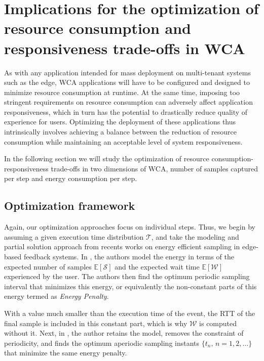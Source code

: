 \section{Implications for the optimization of resource consumption and responsiveness trade-offs in \ac{WCA}}\label{sec:implications:optimization}

As with any application intended for mass deployment on multi-tenant systems such as the edge, \ac{WCA} applications will have to be configured and designed to minimize resource consumption at runtime.
At the same time, imposing too stringent requirements on resource consumption can adversely affect application responsiveness, which in turn has the potential to drastically reduce quality of experience for users.
Optimizing the deployment of these applications thus intrinsically involves achieving a balance between the reduction of resource consumption while maintaining an acceptable level of system responsiveness.

In the following section we will study the optimization of resource consumption-responsiveness trade-offs in two dimensions of \ac{WCA}, number of samples captured per step and energy consumption per step.


\subsection{Optimization framework}

Again, our optimization approaches focus on individual steps.
Thus, we begin by assuming a given execution time distribution \( \mathcal{T} \), and take the modeling and partial solution approach from recents works on energy efficient sampling in edge-based feedback systems.
In \textcite{ICCperiodic1,TMCperiodic}, the authors model the energy in terms of the expected number of samples $\mathbb{E}[\mathcal{S}]$ and the expected wait time $\mathbb{E}[\mathcal{W}]$ experienced by the user.
The authors then find the optimum periodic sampling interval that minimizes this energy, or equivalently the non-constant parts of this energy termed as \textit{Energy Penalty}.

With a value much smaller than the execution time of the event, the \ac{RTT} of the final sample is included in this constant part, which is why $\mathcal{W}$ is computed without it.
Next, in \textcite{secAperiodic}, the author retains the model, removes the constraint of periodicity, and finds the optimum aperiodic sampling instants $\{t_n,\,n=1,2,\dots\}$ that minimize the same energy penalty.

